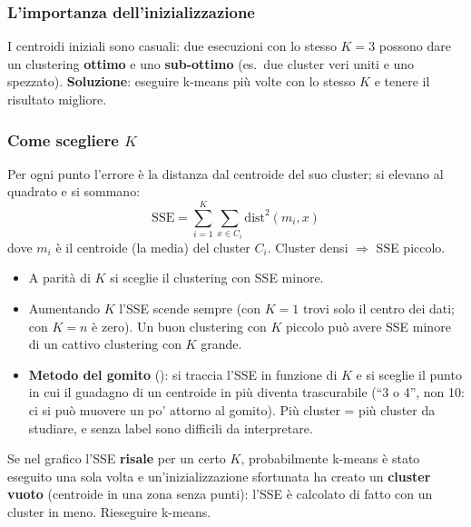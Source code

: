 \subsubsection{L'importanza dell'inizializzazione}
I centroidi iniziali sono casuali: due esecuzioni con lo stesso $K=3$ possono dare un clustering \textbf{ottimo} e uno \textbf{sub-ottimo}
(es.\ due cluster veri uniti e uno spezzato). \textbf{Soluzione}: eseguire k-means più volte con lo stesso $K$ e tenere il risultato migliore.

\subsubsection{Come scegliere $K$}
\begin{definizione}
Per ogni punto l'errore è la distanza dal centroide del suo cluster; si elevano al quadrato e si sommano:
\[
\mathrm{SSE} = \sum_{i=1}^{K}\sum_{x\in C_i}\mathrm{dist}^2(m_i, x)
\]
dove $m_i$ è il centroide (la media) del cluster $C_i$. Cluster densi $\Rightarrow$ SSE piccolo.
\end{definizione}
\begin{itemize}
  \item A parità di $K$ si sceglie il clustering con SSE minore.
  \item Aumentando $K$ l'SSE scende sempre (con $K=1$ trovi solo il centro dei dati; con $K = n$ è zero). Un buon clustering con $K$ piccolo può
        avere SSE minore di un cattivo clustering con $K$ grande.
  \item \textbf{Metodo del gomito} (): si traccia l'SSE in funzione di $K$ e si sceglie il punto in cui il guadagno di un centroide in
        più diventa trascurabile (``3 o 4'', non 10: ci si può muovere un po' attorno al gomito). Più cluster = più cluster da studiare, e senza label
        sono difficili da interpretare.
\end{itemize}
\begin{attenzione}
Se nel grafico l'SSE \textbf{risale} per un certo $K$, probabilmente k-means è stato eseguito una sola volta e un'inizializzazione sfortunata
ha creato un \textbf{cluster vuoto} (centroide in una zona senza punti): l'SSE è calcolato di fatto con un cluster in meno. Rieseguire k-means.
\end{attenzione}

